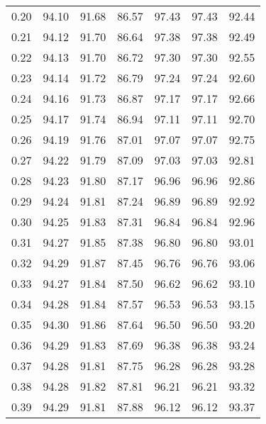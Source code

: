 \begin{tabular}{|c|c|c|c|c|c|c|}
      0.20 &     94.10 &     91.68 &      86.57 &   97.43 &      97.43 &         92.44 \\
      0.21 &     94.12 &     91.70 &      86.64 &   97.38 &      97.38 &         92.49 \\
      0.22 &     94.13 &     91.70 &      86.72 &   97.30 &      97.30 &         92.55 \\
      0.23 &     94.14 &     91.72 &      86.79 &   97.24 &      97.24 &         92.60 \\
      0.24 &     94.16 &     91.73 &      86.87 &   97.17 &      97.17 &         92.66 \\
      0.25 &     94.17 &     91.74 &      86.94 &   97.11 &      97.11 &         92.70 \\
      0.26 &     94.19 &     91.76 &      87.01 &   97.07 &      97.07 &         92.75 \\
      0.27 &     94.22 &     91.79 &      87.09 &   97.03 &      97.03 &         92.81 \\
      0.28 &     94.23 &     91.80 &      87.17 &   96.96 &      96.96 &         92.86 \\
      0.29 &     94.24 &     91.81 &      87.24 &   96.89 &      96.89 &         92.92 \\
      0.30 &     94.25 &     91.83 &      87.31 &   96.84 &      96.84 &         92.96 \\
      0.31 &     94.27 &     91.85 &      87.38 &   96.80 &      96.80 &         93.01 \\
      0.32 &     94.29 &     91.87 &      87.45 &   96.76 &      96.76 &         93.06 \\
      0.33 &     94.27 &     91.84 &      87.50 &   96.62 &      96.62 &         93.10 \\
      0.34 &     94.28 &     91.84 &      87.57 &   96.53 &      96.53 &         93.15 \\
      0.35 &     94.30 &     91.86 &      87.64 &   96.50 &      96.50 &         93.20 \\
      0.36 &     94.29 &     91.83 &      87.69 &   96.38 &      96.38 &         93.24 \\
      0.37 &     94.28 &     91.81 &      87.75 &   96.28 &      96.28 &         93.28 \\
      0.38 &     94.28 &     91.82 &      87.81 &   96.21 &      96.21 &         93.32 \\
      0.39 &     94.29 &     91.81 &      87.88 &   96.12 &      96.12 &         93.37 \\

\end{tabular}
